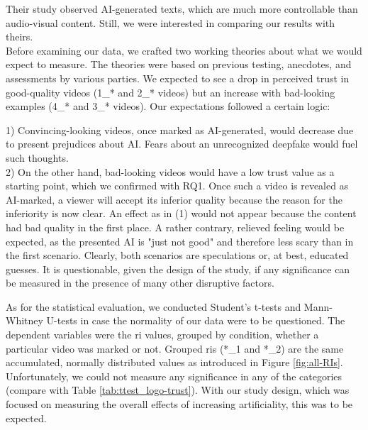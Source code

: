 \documentclass[
  a4paper,  %
  twoside,  %
  bibliography=totoc,
  headsepline,
  cleardoublepage=empty,
  parskip=half,
  draft=false
]{scrbook}
\begin{document}
Their study observed AI-generated texts, which are much more controllable than audio-visual content. Still, we were interested in comparing our results with theirs. \\
Before examining our data, we crafted two working theories about what we would expect to measure. The theories were based on previous testing, anecdotes, and assessments by various parties. We expected to see a drop in perceived trust in good-quality videos (1\_* and 2\_* videos) but an increase with bad-looking examples (4\_* and 3\_* videos). Our expectations followed a certain logic:

1) Convincing-looking videos, once marked as AI-generated, would decrease due to present prejudices about AI. Fears about an unrecognized deepfake would fuel such thoughts. \\
2) On the other hand, bad-looking videos would have a low trust value as a starting point, which we confirmed with RQ1. Once such a video is revealed as AI-marked, a viewer will accept its inferior quality because the reason for the inferiority is now clear. An effect as in (1) would not appear because the content had bad quality in the first place. A rather contrary, relieved feeling would be expected, as the presented AI is "just not good" and therefore less scary than in the first scenario. Clearly, both scenarios are speculations or, at best, educated guesses. It is questionable, given the design of the study, if any significance can be measured in the presence of many other disruptive factors.

As for the statistical evaluation, we conducted Student's t-tests and Mann-Whitney U-tests in case the normality of our data were to be questioned. The dependent variables were the \gls{ri} values, grouped by condition, whether a particular video was marked or not. Grouped \gls{ri}s (*\_1 and *\_2) are the same accumulated, normally distributed values as introduced in Figure \ref{fig:all-RIs}. Unfortunately, we could not measure any significance in any of the categories (compare with Table \ref{tab:ttest_logo-trust}). With our study design, which was focused on measuring the overall effects of increasing artificiality, this was to be expected.
\end{document}
